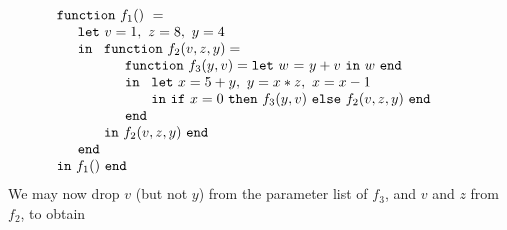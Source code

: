 \begin{equation}
\label{FunctionalConstructionProgramLC1}
\begin{array}{l}
\mathtt{function}\ f_1()\ = \\
  \quad
  \begin{array}{l}
     \mathtt{let}\ v = 1, \ 
                   z = 8, \ 
                   y = 4\\
     \mathtt{in}\ 
     \begin{array}[t]{l}
       \mathtt{function}\ f_2(v,z,y) = \\
       \quad \begin{array}{l}  
               \mathtt{function}\ f_3(y,v) = \letin w {y+v} w\\
               \mathtt{in}\
               \begin{array}[t]{l}
                  \mathtt{let}\ x = {5+y},\
                                y = {x*z},\
                                x = {x-1}\\ 
                  \mathtt{in}\ 
                     \ite {x=0} {\call {f_3} {y,v}} {\call {f_2} {v,z,y}}\
                  \mathtt{end}\
               \end{array}\\
               \mathtt{end}
             \end{array}\\
       \mathtt{in}\ f_2(v,z,y)\ \mathtt{end}
     \end{array}\\
     \mathtt{end}
  \end{array}\\
  \mathtt{in}\ f_1()\ \mathtt{end}
\end{array}
\end{equation}
We may now drop $v$ (but not $y$) from the parameter list of $f_3$,
and $v$ and $z$ from $f_2$, to obtain
